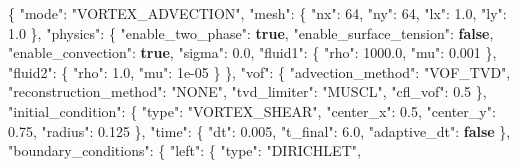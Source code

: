 \documentclass[
  10pt,
]{article}
\newenvironment{Shaded}{}{}
\newcommand{\DataTypeTok}[1]{\textcolor[rgb]{0.56,0.13,0.00}{#1}}
\newcommand{\DecValTok}[1]{\textcolor[rgb]{0.25,0.63,0.44}{#1}}
\newcommand{\FloatTok}[1]{\textcolor[rgb]{0.25,0.63,0.44}{#1}}
\newcommand{\FunctionTok}[1]{\textcolor[rgb]{0.02,0.16,0.49}{#1}}
\newcommand{\KeywordTok}[1]{\textcolor[rgb]{0.00,0.44,0.13}{\textbf{#1}}}
\newcommand{\StringTok}[1]{\textcolor[rgb]{0.25,0.44,0.63}{#1}}
\begin{document}
\begin{Shaded}
\begin{Highlighting}[]
\FunctionTok{\{}
  \DataTypeTok{"mode"}\FunctionTok{:} \StringTok{"VORTEX\_ADVECTION"}\FunctionTok{,}
  \DataTypeTok{"mesh"}\FunctionTok{:} \FunctionTok{\{}
    \DataTypeTok{"nx"}\FunctionTok{:} \DecValTok{64}\FunctionTok{,}
    \DataTypeTok{"ny"}\FunctionTok{:} \DecValTok{64}\FunctionTok{,}
    \DataTypeTok{"lx"}\FunctionTok{:} \FloatTok{1.0}\FunctionTok{,}
    \DataTypeTok{"ly"}\FunctionTok{:} \FloatTok{1.0}
  \FunctionTok{\},}
  \DataTypeTok{"physics"}\FunctionTok{:} \FunctionTok{\{}
    \DataTypeTok{"enable\_two\_phase"}\FunctionTok{:} \KeywordTok{true}\FunctionTok{,}
    \DataTypeTok{"enable\_surface\_tension"}\FunctionTok{:} \KeywordTok{false}\FunctionTok{,}
    \DataTypeTok{"enable\_convection"}\FunctionTok{:} \KeywordTok{true}\FunctionTok{,}
    \DataTypeTok{"sigma"}\FunctionTok{:} \FloatTok{0.0}\FunctionTok{,}
    \DataTypeTok{"fluid1"}\FunctionTok{:} \FunctionTok{\{}
      \DataTypeTok{"rho"}\FunctionTok{:} \FloatTok{1000.0}\FunctionTok{,}
      \DataTypeTok{"mu"}\FunctionTok{:} \FloatTok{0.001}
    \FunctionTok{\},}
    \DataTypeTok{"fluid2"}\FunctionTok{:} \FunctionTok{\{}
      \DataTypeTok{"rho"}\FunctionTok{:} \FloatTok{1.0}\FunctionTok{,}
      \DataTypeTok{"mu"}\FunctionTok{:} \DecValTok{1e{-}05}
    \FunctionTok{\}}
  \FunctionTok{\},}
  \DataTypeTok{"vof"}\FunctionTok{:} \FunctionTok{\{}
    \DataTypeTok{"advection\_method"}\FunctionTok{:} \StringTok{"VOF\_TVD"}\FunctionTok{,}
    \DataTypeTok{"reconstruction\_method"}\FunctionTok{:} \StringTok{"NONE"}\FunctionTok{,}
    \DataTypeTok{"tvd\_limiter"}\FunctionTok{:} \StringTok{"MUSCL"}\FunctionTok{,}
    \DataTypeTok{"cfl\_vof"}\FunctionTok{:} \FloatTok{0.5}
  \FunctionTok{\},}
  \DataTypeTok{"initial\_condition"}\FunctionTok{:} \FunctionTok{\{}
    \DataTypeTok{"type"}\FunctionTok{:} \StringTok{"VORTEX\_SHEAR"}\FunctionTok{,}
    \DataTypeTok{"center\_x"}\FunctionTok{:} \FloatTok{0.5}\FunctionTok{,}
    \DataTypeTok{"center\_y"}\FunctionTok{:} \FloatTok{0.75}\FunctionTok{,}
    \DataTypeTok{"radius"}\FunctionTok{:} \FloatTok{0.125}
  \FunctionTok{\},}
  \DataTypeTok{"time"}\FunctionTok{:} \FunctionTok{\{}
    \DataTypeTok{"dt"}\FunctionTok{:} \FloatTok{0.005}\FunctionTok{,}
    \DataTypeTok{"t\_final"}\FunctionTok{:} \FloatTok{6.0}\FunctionTok{,}
    \DataTypeTok{"adaptive\_dt"}\FunctionTok{:} \KeywordTok{false}
  \FunctionTok{\},}
  \DataTypeTok{"boundary\_conditions"}\FunctionTok{:} \FunctionTok{\{}
    \DataTypeTok{"left"}\FunctionTok{:} \FunctionTok{\{}
      \DataTypeTok{"type"}\FunctionTok{:} \StringTok{"DIRICHLET"}\FunctionTok{,}

\end{Highlighting}
\end{Shaded}
\end{document}
